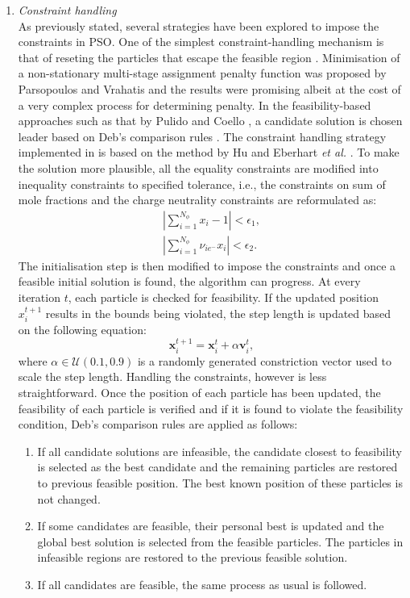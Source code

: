 	\begin{enumerate}
		\item \emph{Constraint handling}\\
			As previously stated, several strategies have been explored to impose the constraints in PSO. One of the simplest constraint-handling mechanism is that of reseting the particles that escape the feasible region \cite{Hu:2002aa,Guo:2004aa,Sun:2009aa}. Minimisation of a non-stationary multi-stage assignment penalty function was proposed by Parsopoulos and Vrahatis \cite{Parsopoulos:2005aa} and the results were promising albeit at the cost of a very complex process for determining penalty. In the feasibility-based approaches such as that by Pulido and Coello \cite{Pulido:2004aa}, a candidate solution is chosen leader based on Deb's comparison rules \cite{Deb:2000aa}. The constraint handling strategy implemented in {\GEM} is based on the method by Hu and Eberhart \textit{et al.} \cite{Hu:2002aa}. To make the solution more plausible, all the equality constraints are modified into inequality constraints to specified tolerance, i.e., the constraints on sum of mole fractions and the charge neutrality constraints are reformulated as:
			\begin{gather}
				\left | \sum_{i=1}^{N_\phi} x_i - 1 \right | <  \epsilon_1,\\
				\left | \sum_{i=1}^{N_\phi} \nu_{i{e^-}} x_i \right | < \epsilon_2.
			\end{gather} 
			The initialisation step is then modified to impose the constraints and once a feasible initial solution is found, the algorithm can progress. At every iteration $t$, each particle is checked for feasibility. If the updated position $x_i^{t+1}$ results in the bounds being violated, the step length is updated based on the following equation:
			\begin{equation}  \label{eq:PSO_pos_alpha}
				\mathbf{x}_i^{t+1} = \mathbf{x}_i^{t} + \alpha \mathbf{v}_i^{t},
			\end{equation}
			where $\alpha \in \mathcal{U} (0.1, 0.9)$ is a randomly generated constriction vector used to scale the step length. Handling the constraints, however is less straightforward. Once the position of each particle has been updated, the feasibility of each particle is verified and if it is found to violate the feasibility condition, Deb's comparison rules \cite{Deb:2000aa} are applied as follows:
			\begin{enumerate}
				\item	If all candidate solutions are infeasible, the candidate closest to feasibility is selected as the best candidate and the remaining particles are restored to previous feasible position. The best known position of these particles is not changed.
				\item If some candidates are feasible, their personal best is updated and the global best solution is selected from the feasible particles. The particles in infeasible regions are restored to the previous feasible solution.
				\item If all candidates are feasible, the same process as usual is followed.
			\end{enumerate}
			

\end{enumerate}
